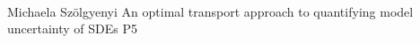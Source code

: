     \\\hline
{}	%
{}		%
{Michaela Szölgyenyi}	%
{An optimal transport approach to quantifying model uncertainty of SDEs}		%
{P5}		%
\\\hline
